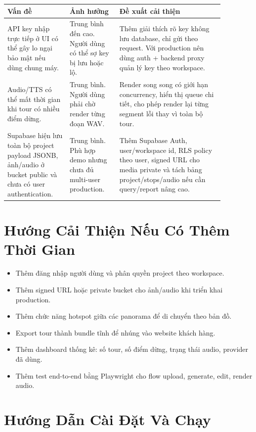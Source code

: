 \documentclass[12pt,a4paper]{article}
\begin{document}
\begin{longtable}{p{0.25\linewidth} p{0.20\linewidth} p{0.42\linewidth}}
\toprule
\textbf{Vấn đề} & \textbf{Ảnh hưởng} & \textbf{Đề xuất cải thiện} \\
\midrule
API key nhập trực tiếp ở UI có thể gây lo ngại bảo mật nếu dùng chung máy. & Trung bình đến cao. Người dùng có thể sợ key bị lưu hoặc lộ. & Thêm giải thích rõ key không lưu database, chỉ gửi theo request. Với production nên dùng auth + backend proxy quản lý key theo workspace. \\
\midrule
Audio/TTS có thể mất thời gian khi tour có nhiều điểm dừng. & Trung bình. Người dùng phải chờ render từng đoạn WAV. & Render song song có giới hạn concurrency, hiển thị queue chi tiết, cho phép render lại từng segment lỗi thay vì toàn bộ tour. \\
\midrule
Supabase hiện lưu toàn bộ project payload JSONB, ảnh/audio ở bucket public và chưa có user authentication. & Trung bình. Phù hợp demo nhưng chưa đủ multi-user production. & Thêm Supabase Auth, user/workspace id, RLS policy theo user, signed URL cho media private và tách bảng project/stops/audio nếu cần query/report nâng cao. \\
\bottomrule
\end{longtable}

\section{Hướng Cải Thiện Nếu Có Thêm Thời Gian}

\begin{itemize}
  \item Thêm đăng nhập người dùng và phân quyền project theo workspace.
  \item Thêm signed URL hoặc private bucket cho ảnh/audio khi triển khai production.
  \item Thêm chức năng hotspot giữa các panorama để di chuyển theo bản đồ.
  \item Export tour thành bundle tĩnh để nhúng vào website khách hàng.
  \item Thêm dashboard thống kê: số tour, số điểm dừng, trạng thái audio, provider đã dùng.
  \item Thêm test end-to-end bằng Playwright cho flow upload, generate, edit, render audio.
\end{itemize}

\section{Hướng Dẫn Cài Đặt Và Chạy}
\end{document}
